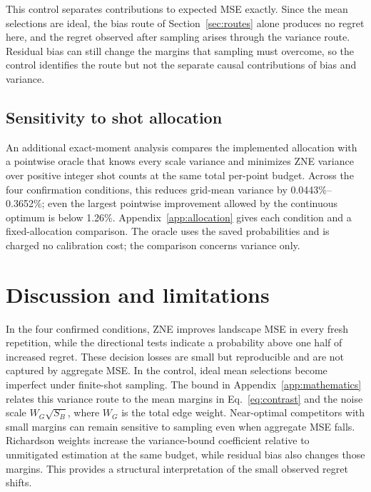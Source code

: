 This control separates contributions to expected MSE exactly. Since the mean selections are ideal, the bias route of Section~\ref{sec:routes} alone produces no regret here, and the regret observed after sampling arises through the variance route. Residual bias can still change the margins that sampling must overcome, so the control identifies the route but not the separate causal contributions of bias and variance.

\subsection{Sensitivity to shot allocation}
An additional exact-moment analysis compares the implemented allocation with a pointwise oracle that knows every scale variance and minimizes ZNE variance over positive integer shot counts at the same total per-point budget. Across the four confirmation conditions, this reduces grid-mean variance by 0.0443\%--0.3652\%; even the largest pointwise improvement allowed by the continuous optimum is below 1.26\%. Appendix~\ref{app:allocation} gives each condition and a fixed-allocation comparison. The oracle uses the saved probabilities and is charged no calibration cost; the comparison concerns variance only.

\section{Discussion and limitations}\label{sec:discussion}
In the four confirmed conditions, ZNE improves landscape MSE in every fresh repetition, while the directional tests indicate a probability above one half of increased regret. These decision losses are small but reproducible and are not captured by aggregate MSE. In the control, ideal mean selections become imperfect under finite-shot sampling. The bound in Appendix~\ref{app:mathematics} relates this variance route to the mean margins in Eq.~\eqref{eq:contrast} and the noise scale $W_G\sqrt{S_B}$, where $W_G$ is the total edge weight. Near-optimal competitors with small margins can remain sensitive to sampling even when aggregate MSE falls. Richardson weights increase the variance-bound coefficient relative to unmitigated estimation at the same budget, while residual bias also changes those margins. This provides a structural interpretation of the small observed regret shifts.

